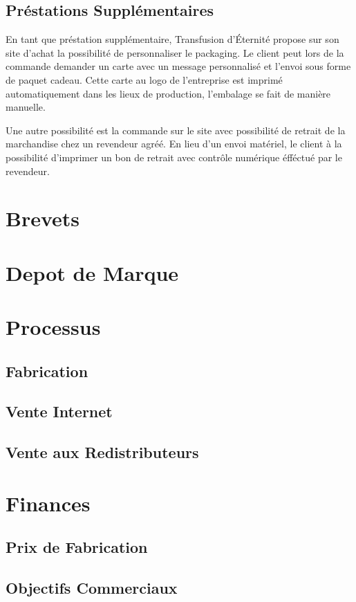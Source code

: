 \documentclass[10pt,a4paper]{article}
\newcommand{\tde}{Transfusion d'Éternité}
\begin{document}
\subsection{Préstations Supplémentaires}
En tant que préstation supplémentaire, \tde{} propose sur son site d'achat la possibilité de personnaliser le packaging.
Le client peut lors de la commande demander un carte avec un message personnalisé et l'envoi sous forme de paquet cadeau.
Cette carte au logo de l'entreprise est imprimé automatiquement dans les lieux de production, l'embalage se fait de manière manuelle.

Une autre possibilité est la commande sur le site avec possibilité de retrait de la marchandise chez un revendeur agréé.
En lieu d'un envoi matériel, le client à la possibilité d'imprimer un bon de retrait avec contrôle numérique éfféctué par le revendeur.
\section{Brevets}
\section{Depot de Marque}
\section{Processus}

\subsection{Fabrication}

\subsection{Vente Internet}
\subsection{Vente aux Redistributeurs}

\section{Finances}

\subsection{Prix de Fabrication}
\subsection{Objectifs Commerciaux}
\end{document}
